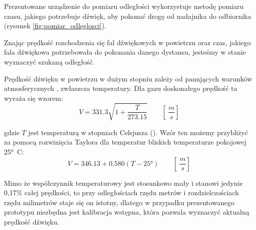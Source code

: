 Prezentowane urządzenie do pomiaru odległości wykorzystuje metodę pomiaru czasu, jakiego
potrzebuje dźwięk, aby pokonać drogę od nadajnika do odbiornika
(rysunek \ref{fig:pomiar_odleglosci}).

Znając prędkość rozchodzenia się fal dźwiękowych w powietrzu oraz czas, jakiego fala dźwiękowa potrzebowała
do pokonania danego dystansu, jesteśmy w stanie wyznaczyć szukaną odległość.

Prędkość dźwięku w powietrzu w dużym stopniu zależy od panujących warunków atmosferycznych \cite{bib:soundSpeed},
zwłaszcza temperatury.
Dla gazu doskonałego prędkość ta wyraża się wzorem:
\[
V = \num{331,3}  \sqrt{1+\frac{T}{\num{273,15}}} \qquad \left[ \SI{}{\frac{m}{s}} \right]
\]

gdzie $T$ jest temperaturą w stopniach Celsjusza (\SI{}{\degC}).
Wzór ten możemy przybliżyć za pomocą rozwinięcia Taylora dla temperatur bliskich temperaturze pokojowej \ang{25}\SI{}{C}:
\[
 V = \num{346,13}  +  \num{0,580}(T - \ang{25})  \qquad \left[ \SI{}{ \frac{m}{s}} \right]
\]

Mimo że współczynnik temperaturowy jest stosunkowo mały i stanowi jedynie 0,17\% całej prędkości,
to przy odległościach rzędu metrów i rozdzielczościach rzędu milimetrów staje się on istotny, 
dlatego w przypadku prezentowanego prototypu niezbędna jest kalibracja wstępna, która pozwala
wyznaczyć aktualną prędkość dźwięku.






